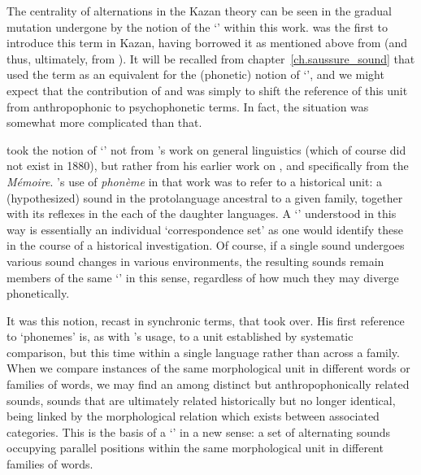 The centrality of alternations in the Kazan theory can be seen in the
gradual mutation undergone by the notion of the `' within this
work. {\Kruszewski} was the first to introduce this term in Kazan, having
borrowed it as mentioned above from {\Saussure} (and thus, ultimately,
from {\DufricheDesgenettes}). It will be recalled from
chapter~\ref{ch.saussure_sound} that {\Saussure} used the term  as
an equivalent for the (phonetic) notion of `', and we
might expect that the contribution of {\Baudouin} and {\Kruszewski} was
simply to shift the reference of this unit from anthropophonic to
psychophonetic terms. In fact, the situation was somewhat more
complicated than that.

{\Kruszewski} took the notion of `' not from {\Saussure}'s work on
general linguistics (which of course did not exist in 1880), but
rather from his earlier work on , and specifically from
the \textsl{Mémoire}. {\Saussure}'s use of \emph{phonème} in that work
was to refer to a historical unit: a (hypothesized) sound in the
protolanguage ancestral to a given family, together with its reflexes
in the each of the daughter languages. A `' understood in this
way is essentially an individual `correspondence set' as one would
identify these in the course of a historical investigation. Of course,
if a single sound undergoes various sound changes in various
environments, the resulting sounds remain members of the same
`' in this sense, regardless of how much they may diverge
phonetically.

It was this notion, recast in synchronic terms, that {\Kruszewski} took
over. His first reference to `phonemes' is, as with {\Saussure}'s usage,
to a unit established by systematic comparison, but this time within a
single language rather than across a family. When we compare instances
of the same morphological unit in different words or families of
words, we may find an  among distinct but
anthropophonically related sounds, sounds that are ultimately related
historically but no longer identical, being linked by the
morphological relation which exists between associated
categories. This is the basis of a `' in a new sense: a set of
alternating sounds occupying parallel positions within the same
morphological unit in different families of words.

